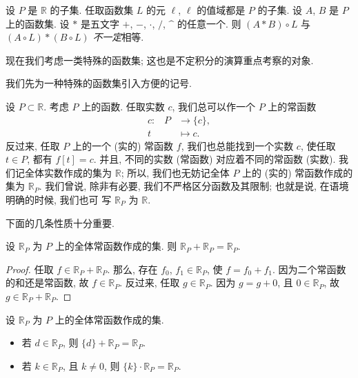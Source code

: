 \begin{example}
    设 $P$ 是 $\mathbb{R}$ 的子集.
    任取函数集 $L$ 的元 $\ell$, $\ell$ 的值域都是 $P$ 的子集.
    设 $A$, $B$ 是 $P$ 上的函数集.
    设 $\ast$ 是五文字
    $+$, $-$, $\cdot$, $/$, $\text{\textasciicircum}$
    的任意一个.
    则
    $(A \ast B) \circ L$
    与
    $(A \circ L) \ast (B \circ L)$
    \emph{不一定}相等.
\end{example}

现在我们考虑一类特殊的函数集;
这也是不定积分的演算重点考察的对象.

我们先为一种特殊的函数集引入方便的记号.

设 $P \subset \mathbb{R}$.
考虑 $P$ 上的函数.
任取实数 $c$, 我们总可以作一个 $P$ 上的常函数
\begin{align*}
    \text{$c$:} \quad
    P & \to \{ c \}, \\
    t & \mapsto c.
\end{align*}
反过来, 任取 $P$ 上的一个 (实的) 常函数 $f$,
我们也总能找到一个实数 $c$, 使任取 $t \in P$, 都有 $f[t] = c$.
并且, 不同的实数 (常函数) 对应着不同的常函数 (实数).
我们记全体实数作成的集为 $\mathbb{R}$;
所以, 我们也无妨记全体 $P$ 上的 (实的) 常函数作成的集为
$\mathbb{R}_{P}$.
我们曾说, 除非有必要, 我们不严格区分函数及其限制;
也就是说, 在语境明确的时候, 我们也可%
写 $\mathbb{R}_{P}$ 为 $\mathbb{R}$.

下面的几条性质十分重要.

\begin{theorem}
    设 $\mathbb{R}_{P}$ 为 $P$ 上的全体常函数作成的集.
    则 $\mathbb{R}_{P} + \mathbb{R}_{P} = \mathbb{R}_{P}$.
\end{theorem}

\begin{proof}
    任取 $f \in \mathbb{R}_{P} + \mathbb{R}_{P}$.
    那么, 存在 $f_0$, $f_1 \in \mathbb{R}_{P}$,
    使 $f = f_0 + f_1$.
    因为二个常函数的和还是常函数,
    故 $f \in \mathbb{R}_{P}$.
    反过来, 任取 $g \in \mathbb{R}_{P}$.
    因为 $g = g + 0$,
    且 $0 \in \mathbb{R}_{P}$,
    故 $g \in \mathbb{R}_{P} + \mathbb{R}_{P}$.
\end{proof}

\begin{theorem}
    设 $\mathbb{R}_{P}$ 为 $P$ 上的全体常函数作成的集.
    \begin{itemize}
        \item 若 $d \in \mathbb{R}_{P}$,
              则 $\{ d \} + \mathbb{R}_{P} = \mathbb{R}_{P}$.
        \item 若 $k \in \mathbb{R}_{P}$,
              且 $k \neq 0$,
              则 $\{ k \} \cdot \mathbb{R}_{P} = \mathbb{R}_{P}$.
    \end{itemize}
\end{theorem}

